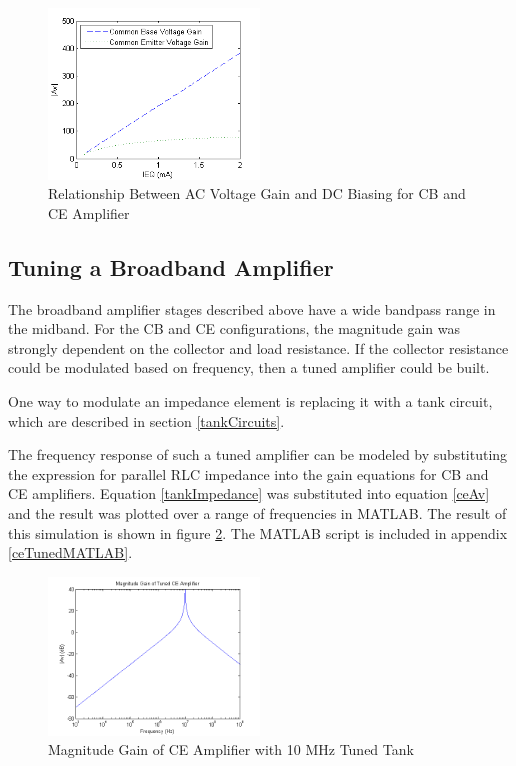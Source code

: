 \documentclass[titlepage, letterpaper, 11pt]{article}
\begin{document}
\begin{figure}[ht]
	\centering
	\includegraphics[width=0.5\textwidth]
		{MATLAB/AvQptRelationship}
	\caption{
		Relationship Between AC Voltage Gain and DC Biasing
		for CB and CE Amplifier
	}
	\label{gainQptRelation}
\end{figure}

\subsection{Tuning a Broadband Amplifier}

The broadband amplifier stages described above have a wide bandpass
range in the midband. For the CB and CE configurations, the magnitude
gain was strongly dependent on the collector and load resistance. If
the collector resistance could be modulated based on frequency, then
a tuned amplifier could be built.

One way to modulate an impedance element is replacing it with a tank
circuit, which are described in section \ref{tankCircuits}.

The frequency response of such a tuned amplifier can be modeled by
substituting the expression for parallel RLC impedance into the gain
equations for CB and CE amplifiers. Equation \ref{tankImpedance} was
substituted into equation \ref{ceAv} and the result was plotted over
a range of frequencies in MATLAB. The result of this simulation is
shown in figure \ref{ceTunedMag}. The MATLAB script is included
in appendix \ref{ceTunedMATLAB}.

\begin{figure}[ht]
	\centering
	\includegraphics[width=0.5\textwidth]{MATLAB/ceTunedMag}
	\caption{Magnitude Gain of CE Amplifier with 10 MHz Tuned Tank}
	\label{ceTunedMag}
\end{figure}
\end{document}
